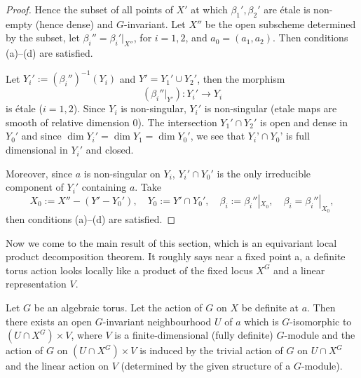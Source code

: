 \documentclass[12pt]{article}
\begin{document}
\begin{proof}
Hence the subset of all points of $X'$ at which $\beta_1', \beta_2'$ are \'etale is non-empty (hence dense) and $G$-invariant. Let $X''$ be the open subscheme determined by the subset, let $\beta_i'' = \beta_i'|_{X''}$, for $i=1,2$, and $a_0=(a_1,a_2)$. Then conditions (a)--(d) are satisfied.

\medskip

Let $Y_i' := (\beta_i'')^{-1}(Y_i)$ and $Y' = Y_1' \cup Y_2'$, then the morphism 
\[
   (\beta_i''|_{Y'}) : Y_i' \to Y_i
\]
is \'etale ($i=1,2$). Since $Y_i$ is non-singular, $Y_i'$ is non-singular (etale maps are smooth of relative dimension 0). The intersection $Y_1' \cap Y_2'$ is open and dense in $Y_0'$ and since $\dim Y_i' = \dim Y_1 = \dim Y_0'$, we see that $Y_i’ \cap Y_0’$ is full dimensional in $Y_i'$ and closed. 

Moreover, since $a$ is non-singular on $Y_i$, $Y_i'\cap Y_0'$ is the only irreducible component of $Y_i'$ containing $a$. Take
\[
   X_0 := X'' - (Y' - Y_0'), \quad Y_0 := Y' \cap Y_0', \quad \beta_i := \beta_i''|_{X_0}, \quad \beta_i = \beta_i''|_{X_0},
\]
then conditions (a)--(d) are satisfied.
\end{proof}

Now we come to the main result of this section, which is an equivariant local product decomposition theorem. It roughly says near a fixed point a, a definite torus action looks locally like a product of the fixed locus $X^G$ and a linear representation $V$.


\begin{theorem}[2.5]
Let $G$ be an algebraic torus. Let the action of $G$ on $X$ be definite at $a$. Then there exists an open $G$-invariant neighbourhood $U$ of $a$ which is $G$-isomorphic to $(U \cap X^G) \times V$, where $V$ is a finite-dimensional (fully definite) $G$-module and the action of $G$ on $(U \cap X^G) \times V$ is induced by the trivial action of $G$ on $U \cap X^G$ and the linear action on $V$ (determined by the given structure of a $G$-module).
\end{theorem}
\end{document}
